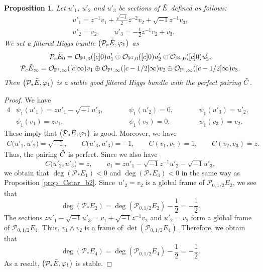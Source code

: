 \documentclass[10pt,a4paper]{amsart}
\numberwithin{equation}{section}
\newtheorem{Proposition}[Theorem]{Proposition}
 { \theoremstyle{definition}
\newtheorem{Definition}[Theorem]{Definition}
\newtheorem{Note}[Theorem]{Note}
\newtheorem{Example}[Theorem]{Example}
\newtheorem{Remark}[Theorem]{Remark}

\newtheorem{Question}[Theorem]{Question}
\newtheorem{Assumption}[Theorem]{Assumption}}
\newcommand{\ps}{\mathbb{P}}
\newcommand{\strsheaf}{\mathcal{O}}
\begin{document}
\begin{Proposition}\label{prop_Cstar_b1}
 Let $u'_1$, $u'_2$ and $u'_3$ be sections of $\Tilde{E}$ defined as follows:
 \begin{gather*}
 u'_1 = z^{-1}v_1 + \frac{\sqrt{-1}}{2}z^{-2}v_2 + \sqrt{-1}z^{-1}v_3,\\
 u'_2 = v_2,\qquad u'_3 = -\frac{1}{2} z^{-1}v_2 + v_3.
 \end{gather*}
 We set a filtered Higgs bundle $\bigl(\mathcal{P}_{*}\Tilde{E},\varphi_1\bigr)$ as
 \begin{gather*}
 \mathcal{P}_c \Tilde{E}_{0} = \strsheaf_{\ps^1,0}([c]0)u'_1\oplus \strsheaf_{\ps^1,0}([c]0)u'_2\oplus \strsheaf_{\ps^1,0}([c]0)u'_3,\\
 \mathcal{P}_c \Tilde{E}_{\infty} = \strsheaf_{\ps^1,\infty}([c]\infty)v_1\oplus \strsheaf_{\ps^1,\infty}([c-1/2]\infty)v_2\oplus \strsheaf_{\ps^1,\infty}([c-1/2]\infty)v_3.
 \end{gather*}
 Then $\bigl(\mathcal{P}_{*}\Tilde{E},\varphi_1\bigr)$ is a stable good filtered Higgs bundle with the perfect pairing $\Tilde{C}$.
\end{Proposition}
\begin{proof}
 We have
 \begin{alignat*}{4}
 &\psi_1(u'_1) = zu'_1 - \sqrt{-1}u'_3,\qquad&& \psi_1(u'_2) = 0,\qquad&& \psi_1(u'_3) = u'_2,&\\
 &\psi_1(v_1) = zv_1, \qquad&& \psi_1(v_2) = 0, \qquad&& \psi_1(v_3) = v_2.&
 \end{alignat*}
 These imply that $\bigl(\mathcal{P}_{*}\Tilde{E},\varphi_1\bigr)$ is good. Moreover, we have
 \begin{gather*}
 C\big(u'_1,u'_2\big)=\sqrt{-1},\qquad C\big(u'_3,u'_3\big)=-1,\qquad C(v_1,v_1)=1,\qquad C(v_2,v_3)=z.
 \end{gather*}
 Thus, the pairing $\Tilde{C}$ is perfect. Since we also have
 \begin{equation*}
 C\big(u'_2,u'_3\big)= z, \qquad v_1 = zu'_1 -\sqrt{-1}z^{-1}u'_2 - \sqrt{-1}u'_3,
 \end{equation*}
 we obtain that $\deg(\mathcal{P}_{*}E_1)<0$ and $\deg(\mathcal{P}_{*}E_3)<0$ in the same way as Proposition \ref{prop_Cstar_b2}. Since~${u'_2=v_2}$ is a global frame of $\mathcal{P}_{0,1/2}E_2$, we see that
 \begin{equation*}
 \deg(\mathcal{P}_{*}E_2) = \deg(\mathcal{P}_{0,1/2}E_2) - \frac{1}{2} = -\frac{1}{2}.
 \end{equation*}
 The sections $zu'_1-\sqrt{-1}u'_3=v_1+\sqrt{-1}z^{-1}v_2$ and $u'_2=v_2$ form a global frame of $\mathcal{P}_{0,1/2}E_4$. Thus, $v_1\wedge v_2$ is a frame of $\det(\mathcal{P}_{0,1/2}E_4)$. Therefore, we obtain that
 \begin{equation*}
 \deg(\mathcal{P}_{*}E_4) = \deg(\mathcal{P}_{0,1/2}E_4) - \frac{1}{2} = -\frac{1}{2}.
 \end{equation*}
 As a result, $\bigl(\mathcal{P}_{*}\Tilde{E},\varphi_1\bigr)$ is stable.
\end{proof}
\end{document}
